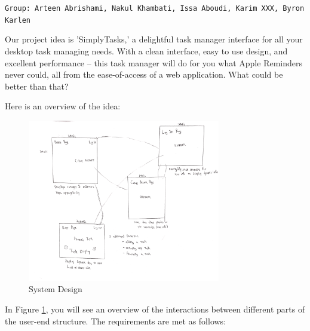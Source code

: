 \documentclass[10pt, letterpaper]{article}
\let\tab\quad
\begin{document}
\texttt{Group: Arteen Abrishami, Nakul Khambati, Issa Aboudi, Karim XXX, Byron Karlen}

\tab Our project idea is 'SimplyTasks,' a delightful task manager interface for all your desktop task managing needs. With a clean interface, easy to use design, and excellent performance -- this task manager will do for you what Apple Reminders never could, all from the ease-of-access of a web application. What could be better than that?

\tab Here is an overview of the idea: 

\begin{figure}[h!]
	\begin{center}
		\includegraphics[width=0.75\textwidth]{illustration.png}
	\caption{System Design}
	\label{fig:design}
	\end{center}
\end{figure}

\tab In Figure \ref{fig:design}, you will see an overview of the interactions between different parts of the user-end structure. The requirements are met as follows:
\end{document}
